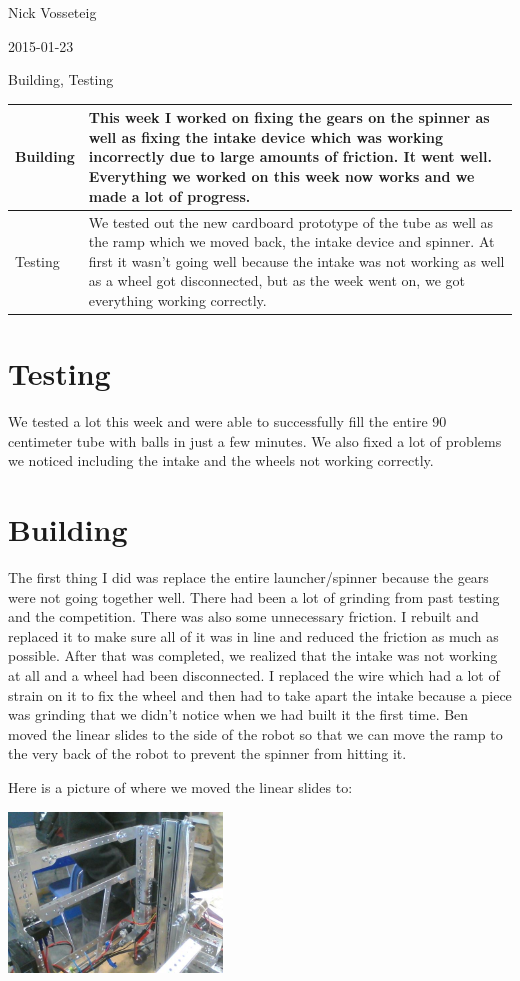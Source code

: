 Nick Vosseteig

2015-01-23

Building, Testing

\begin{tabular}{|p{5cm}|p{5cm}|}
 \hline
 Building&
This week I worked on fixing the gears on the spinner as well as fixing the intake device which was working incorrectly due to large amounts of friction. It went well. Everything we worked on this week now works and we made a lot of progress. 
 \\
 \hline
Testing&
We tested out the new cardboard prototype of the tube as well as the ramp which we moved back, the intake device and spinner. At first it wasn’t going well because the intake was not working as well as a wheel got disconnected, but as the week went on, we got everything working correctly.
 \\
 \hline
\end{tabular}

\section*{Testing}
We tested a lot this week and were able to successfully fill the entire 90 centimeter tube with balls in just a few minutes. We also fixed a lot of problems we noticed including the intake and the wheels not working correctly. 


\section*{Building}
	The first thing I did was replace the entire launcher/spinner because the gears were not going together well. There had been a lot of grinding from past testing and the competition. There was also some unnecessary friction. I rebuilt and replaced it to make sure all of it was in line and reduced the friction as much as possible. After that was completed, we realized that the intake was not working at all and a wheel had been disconnected. I replaced the wire which had a lot of strain on it to fix the wheel and then had to take apart the intake because a piece was grinding that we didn’t notice when we had built it the first time. Ben moved the linear slides to the side of the robot so that we can move the ramp to the very back of the robot to prevent the spinner from hitting it.

Here is a picture of where we moved the linear slides to:
\begin{center}
 \includegraphics[width=215px]{./Entries/Images/slidesonside.jpg}
\end{center}
